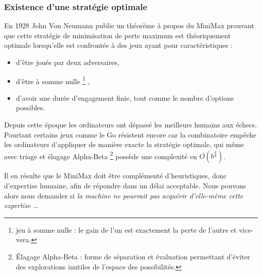 \subsubsection{Existence d'une stratégie optimale}

En 1928 John Von Neumann publie un théorème à propos du \og MiniMax \fg{} prouvant que cette stratégie de minimisation de perte maximum est théoriquement optimale lorsqu'elle est confrontée à des jeux ayant pour caractéristiques :

\begin{itemize}
\item d'être joués par deux adversaires,
\item d'être à \og somme nulle \footnote{ jeu à \og somme nulle \fg{}: le gain de l'un est exactement la perte de l'autre et vice-vera. } \fg{},
\item d'avoir une durée d'engagement finie, tout comme le nombre d'options possibles.
\end{itemize}

Depuis cette époque les ordinateurs ont dépassé les meilleurs humains aux échecs. Pourtant certains jeux comme le Go résistent encore car la combinatoire empêche les ordinateurs d'appliquer de manière exacte la stratégie optimale, qui même avec triage et élagage \og Alpha-Beta \fg \footnote{ \og Élagage Alpha-Beta \fg : forme de séparation et évaluation permettant d'éviter des explorations inutiles de l'espace des possibilités. } possède une complexité en $O(b^{\frac{d}{2}})$.

Il en résulte que le \og MiniMax \fg{} doit être complémenté d'heuristiques, donc d'expertise humaine, afin de répondre dans un délai acceptable. Nous pouvons alors nous demander si \emph{la machine ne pourrait pas acquérir d'elle-même cette expertise \dots }
